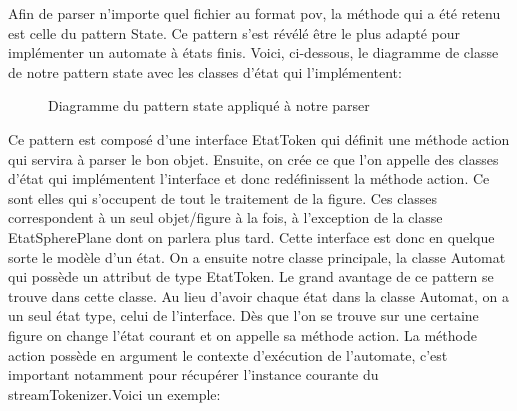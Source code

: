 \documentclass[../../Rapport RayTracer]{subfiles}
\begin{document}
Afin de parser n'importe quel fichier au format pov, la méthode qui a été retenu est celle du pattern State. Ce pattern s'est révélé être le plus adapté pour implémenter un automate à états finis. Voici, ci-dessous, le diagramme de classe de notre pattern state avec les classes d'état qui l'implémentent:

\begin{figure}[h!]
	
	\caption{Diagramme du pattern state appliqué à notre parser}
	\label{diagrammePatternState}
\end{figure}
\FloatBarrier

Ce pattern est composé d'une interface EtatToken qui définit une méthode action qui servira à parser le bon objet. Ensuite, on crée ce que l'on appelle des classes d'état qui implémentent l'interface et donc redéfinissent la méthode action. Ce sont elles qui s'occupent de tout le traitement de la figure. Ces classes correspondent à un seul objet/figure à la fois, à l'exception de la classe EtatSpherePlane dont on parlera plus tard. Cette interface est donc en quelque sorte le modèle d'un état.
On a ensuite notre classe principale, la classe Automat qui possède un attribut de type EtatToken. Le grand avantage de ce pattern se trouve dans cette classe. Au lieu d'avoir chaque état dans la classe Automat, on a un seul état type, celui de l'interface. Dès que l'on se trouve sur une certaine figure on change l'état courant et on appelle sa méthode action. La méthode action possède en argument le contexte d'exécution de l'automate, c'est important notamment pour récupérer l'instance courante du streamTokenizer.Voici un exemple:
 
\end{document}
